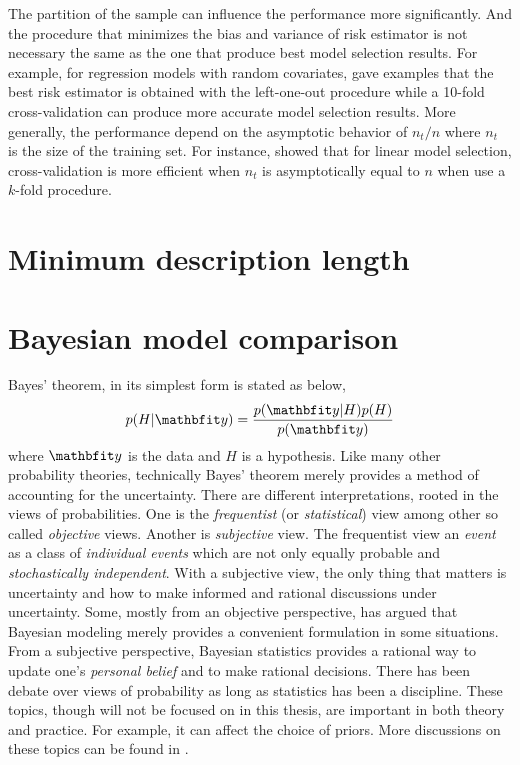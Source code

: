 The partition of the sample can influence the performance more significantly.
And the procedure that minimizes the bias and variance of risk estimator is
not necessary the same as the one that produce best model selection results.
For example, for regression models with random covariates,
\cite{Breiman:1992vx} gave examples that the best risk estimator is obtained
with the left-one-out procedure while a 10-fold cross-validation can produce
more accurate model selection results. More generally, the performance
depend on the asymptotic behavior of $n_t/n$ where $n_t$ is the size of the
training set. For instance, \cite{Shao:1997vx} showed that for linear model
selection, cross-validation is more efficient when $n_t$ is asymptotically
equal to $n$ when use a $k$-fold procedure.

\section{Minimum description length}
\label{sec:Minimum description length}

\section{Bayesian model comparison}
\label{sec:Bayesian model comparison}

Bayes' theorem, in its simplest form is stated as below,
\begin{equation}
  p(H|\data) = \frac{p(\data|H)p(H)}{p(\data)} \label{eq:bayes}
\end{equation}
where $\data$ is the data and $H$ is a hypothesis. Like many other probability
theories, technically Bayes' theorem merely provides a method of accounting
for the uncertainty. There are different interpretations, rooted in the views
of probabilities. One is the \emph{frequentist} (or \emph{statistical}) view
among other so called \emph{objective} views. Another is \emph{subjective}
view. The frequentist view an \emph{event} as a class of \emph{individual
  events} which are not only equally probable and \emph{stochastically
  independent}. With a subjective view, the only thing that matters is
uncertainty and how to make informed and rational discussions under
uncertainty. Some, mostly from an objective perspective, has argued that
Bayesian modeling merely provides a convenient formulation in some situations.
From a subjective perspective, Bayesian statistics provides a rational way to
update one's \emph{personal belief} and to make rational decisions. There has
been debate over views of probability as long as statistics has been a
discipline. These topics, though will not be focused on in this thesis, are
important in both theory and practice. For example, it can affect the choice
of priors. More discussions on these topics can be found in
\cite[][chap.~1]{Bernardo:1994vd}.

